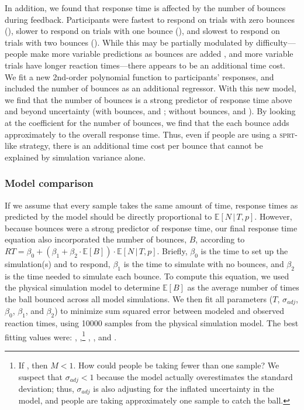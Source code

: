 \documentclass[10pt,letterpaper]{article}
\begin{document}
In addition, we found that response time is affected by the number of bounces during feedback.
Participants were fastest to respond on trials with zero bounces (\RTZeroBounces{}), slower to respond on trials with one bounce (\RTOneBounces{}), and slowest to respond on trials with two bounces (\RTTwoBounces{}).
While this may be partially modulated by difficulty---people make more variable predictions as bounces are added \cite{Smith:2013fc}, and more variable trials have longer reaction times---there appears to be an additional time cost.
We fit a new 2nd-order polynomial function to participants' responses, and included the number of bounces as an additional regressor.
With this new model, we find that the number of bounces is a strong predictor of response time above and beyond uncertainty (with bounces, \AicSecondOrderWithBounces{} and \BicSecondOrderWithBounces{}; without bounces, \AicSecondOrder{} and \BicSecondOrder{}).
By looking at the coefficient for the number of bounces, we find that the each bounce adds approximately \RTBounceCoef{} to the overall response time.
Thus, even if people are using a \textsc{sprt}-like strategy, there is an additional time cost per bounce that cannot be explained by simulation variance alone.

\subsubsection{Model comparison}

If we assume that every sample takes the same amount of time, response times as predicted by the model should be directly proportional to $\mathbb{E}[N\,|\,T,p]$.
However, because bounces were a strong predictor of response time, our final response time equation also incorporated the number of bounces, $B$, according to $RT = \beta_0 + (\beta_1 + \beta_2\cdot{}\mathbb{E}[B]) \cdot{}\mathbb{E}[N\,|\,T,p]$.
Briefly, $\beta_0$ is the time to set up the simulation(s) and to respond, $\beta_1$ is the time to simulate with no bounces, and $\beta_2$ is the time needed to simulate each bounce.
To compute this equation, we used the physical simulation model to determine $\mathbb{E}[B]$ as the average number of times the ball bounced across all model simulations.
We then fit all parameters ($T$, $\sigma_{adj}$, $\beta_0$, $\beta_1$, and $\beta_2$) to minimize sum squared error between modeled and observed reaction times, using 10000 samples from the physical simulation model.
The best fitting values were: \threshold{}, \sdadj{},\footnote{If \sdadj{}, then $M<1$. How could people be taking fewer than one sample?
We suspect that $\sigma_{adj}<1$ because the model actually overestimates the standard deviation; thus, $\sigma_{adj}$ is also adjusting for the inflated uncertainty in the model, and people are taking approximately one sample to catch the ball.} \betazero{}, \betaone{}, and \betatwo{}.
\end{document}
